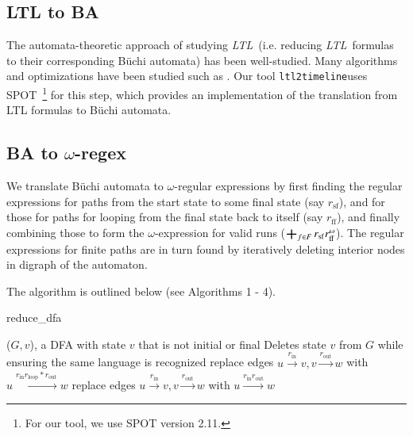 \documentclass[preprint,12pt]{elsarticle}
\theoremstyle{definition}
\theoremstyle{remark}
\DeclareMathOperator*{\bigplus}{\scalerel*{+}{\sum}}
\newcommand{\ltl}{\textit{LTL}}
\newcommand{\Buchi}{B\"{u}chi }
\newcommand{\tool}{\hspace{0.1cm}\texttt{ltl2timeline}\hspace{0.1cm}}
\begin{document}
\subsection{LTL to BA} \label{ltl2aut}
The automata-theoretic approach \cite{ORBi-a8d60ab6-1101-4434-9511-c01ea4e5a15b} of studying \ltl\ (i.e. reducing \ltl\ formulas to their corresponding \Buchi automata) has been well-studied. Many algorithms and optimizations have been studied such as \cite{DGV99, F03}. Our tool \tool uses SPOT~\cite{Dur22}\footnote{For our tool, we use SPOT version 2.11.} for this step, which provides an implementation of the translation from LTL formulas to \Buchi automata.

\subsection{BA to $\omega$-regex} \label{aut2regex}
We translate \Buchi automata to $\omega$-regular expressions by first finding the regular expressions for paths from the start state to some final state (say $r_\mathrm{sf}$), and for those for paths for looping from the final state back to itself (say $r_\mathrm{ff}$), and finally combining those to form the $\omega$-expression for valid runs ($\bigplus_{f\in F} r_\mathrm{sf}r_\mathrm{ff}^\omega$). The regular expressions for finite paths are in turn found by iteratively deleting interior nodes in digraph of the automaton.

The algorithm is outlined below (see Algorithms 1 - 4). %

\begin{algorithm}[h!]
    \caption{reduce\_dfa}
    \begin{algorithmic}
        \Require ($G, v$), a DFA with state $v$ that is not initial or final
        \Ensure Deletes state $v$ from $G$ while ensuring the same language is recognized
                \State replace edges $u\xrightarrow{r_\mathrm{in}} v, v \xrightarrow{r_\mathrm{out}} w$ with $u \xrightarrow{r_\mathrm{in} r_\mathrm{loop}* r_\mathrm{out}} w$
            \Else
                \State replace edges $u\xrightarrow{r_\mathrm{in}} v, v \xrightarrow{r_\mathrm{out}} w$ with $u \xrightarrow{r_\mathrm{in}  r_\mathrm{out}} w$
            \EndIf
        \EndFor
    \end{algorithmic}
\end{algorithm}
\end{document}
